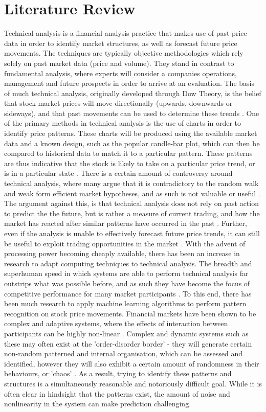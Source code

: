 \documentclass[a4paper,latin]{paper}
\begin{document}
\section{Literature Review} 
Technical analysis is a financial analysis practice that makes use of past price data in order to identify market structures, as well as forecast future price movements. The techniques are typically objective methodologies which rely solely on past market data (price and volume). They stand in contrast to fundamental analysis, where experts will consider a companies operations, management and future prospects in order to arrive at an evaluation. The basis of much technical analysis, originally developed through Dow Theory, is the belief that stock market prices will move directionally (upwards, downwards or sideways), and that past movements can be used to determine these trends \cite {murphy}.
\hfill \break \break
One of the primary methods in technical analysis is the use of charts in order to identify price patterns. These charts will be produced using the available market data and a known design, such as the popular candle-bar plot, which can then be compared to historical data to match it to a particular pattern. These patterns are thus indicative that the stock is likely to take on a particular price trend, or is in a particular state \cite {murphy}.  There is a certain amount of controversy around technical analysis, where many argue that it is contradictory to the random walk and weak form efficient market hypotheses, and as such is not valuable or useful \cite {griffioen}. The argument against this, is that technical analysis does not rely on past action to predict the the future, but is rather a measure of current trading, and how the market has reacted after similar patterns have occurred in the past \cite {kahn}. Further, even if the analysis is unable to effectively forecast future price trends, it can still be useful to exploit trading opportunities in the market \cite{schwager}. 
\hfill \break \break
With the advent of processing power becoming cheaply available, there has been an increase in research to adapt computing techniques to technical analysis. The breadth and superhuman speed in which systems are able to perform technical analysis far outstrips what was possible before, and as such they have become the focus of competitive performance for many market participants \cite {johnson}. To this end, there has been much research to apply machine learning algorithms to perform pattern recognition on stock price movements.
\hfill \break \break
Financial markets have been shown to be complex and adaptive systems, where the effects of interaction between participants can be highly non-linear \cite {arthur}. Complex and dynamic systems such as these may often exist at the 'order-disorder border' - they will generate certain non-random patterned and internal organisation, which can be assessed and identified, however they will also exhibit a certain amount of randomness in their behaviours, or 'chaos' \cite {crutchfield}. As a result, trying to identify these patterns and structures is a simultaneously reasonable and notoriously difficult goal. While it is often clear in hindsight that the patterns exist, the amount of noise and nonlinearity in the system can make prediction challenging.
\end{document}
